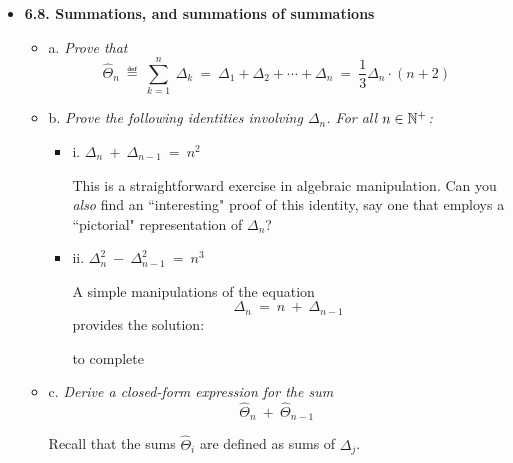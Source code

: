 \begin{itemize}
{\em Propose an alternative analysis by changing the groupings where the terms are gathered 3 by 3}
\[ 
\begin{array}{ll}
S_i & = \left( \frac{1}{3i-1} + \frac{1}{3i} + \frac{1}{3i+1} \right) 
\end{array} \]
\[ 
\begin{array}{ll}
S^{(H)}  & = 1 + S_1 +  \cdots + S_i + \cdots  > 1 + 3.\frac{1}{3} + 3.\frac{1}{6} + \cdots + 3.\frac{1}{3i} + \cdots
\end{array} \]

$S^{(H)}  = 1 + S_1 +  \cdots + S_i +  \cdots > 1 + 3.\frac{1}{3} + 3.\frac{1}{6} +  \cdots + 3.\frac{1}{3k} + \cdots$

since $S_i > 3.\frac{1}{i} $

The proof is by contradiction:
if $S^{(H)} $ is finite, from the previous relation we have: $S^{(H)}  > 1 + S^{(H)} $, which is obviously impossible.
\medskip

\item
{\bf 6.8. Summations, and summations of summations}
\smallskip

  \begin{itemize}
  \item a.
{\em Prove that}
\[ \widehat{\Theta}_n \ \eqdef \  \sum_{k=1}^n \ \Delta_k \ = \   
\Delta_1 + \Delta_2 + \cdots + \Delta_n \ = \ \frac{1}{3} \Delta_n \cdot (n+2) \]


  \item b.
{\em Prove the following identities involving $\Delta_n$.  For all $n \in \mathbb{N}^+$:}
    \begin{itemize}
    \item i.
$\Delta_n \ + \ \Delta_{n-1} \ = \ n^2$

\smallskip

This is a straightforward exercise in algebraic manipulation.  Can you {\em also} find an ``interesting" proof of this identity, say one that employs a ``pictorial" representation of $\Delta_n$?

 \item ii.
$\Delta_n^2 \ - \ \Delta_{n-1}^2 \ = \ n^3$

\smallskip

A simple manipulations of the equation 
\[ \Delta_n \ = \ n \ + \ \Delta_{n-1} \]
provides the solution:

to complete
   \end{itemize}

  \item c.
{\em Derive a closed-form expression for the sum}
\[ \widehat{\Theta}_n \ + \ \widehat{\Theta} _{n-1} \]

\smallskip

Recall that the sums $\widehat{\Theta}_i$ are defined as sums of $\Delta_j$.  
\end{itemize}
\end{itemize} 


